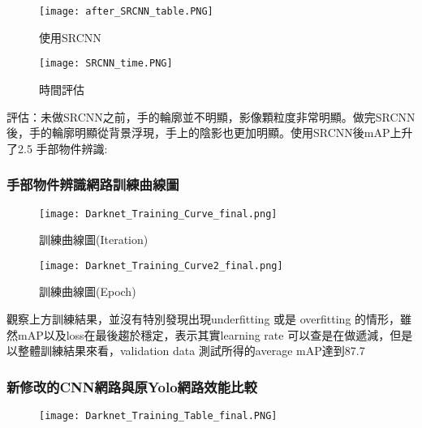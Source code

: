 \begin{figure}[H]
    \centering
    \texttt{[image: after\_SRCNN\_table.PNG]}
    \caption{使用SRCNN}
    \label{fig:使用SRCNN}
\end{figure}

\begin{figure}[H]
    \centering
    \texttt{[image: SRCNN\_time.PNG]}
    \caption{時間評估}
    \label{時間評估}
\end{figure}


評估：未做SRCNN之前，手的輪廓並不明顯，影像顆粒度非常明顯。做完SRCNN後，手的輪廓明顯從背景浮現，手上的陰影也更加明顯。使用SRCNN後mAP上升了2.5%
手部物件辨識:

\subsubsection{手部物件辨識網路訓練曲線圖}

\begin{figure}[H]
    \centering
    \texttt{[image: Darknet\_Training\_Curve\_final.png]}
    \caption{訓練曲線圖(Iteration)}
    \label{fig:訓練曲線圖(Iteration)}
\end{figure}

\begin{figure}[H]
    \centering
    \texttt{[image: Darknet\_Training\_Curve2\_final.png]}
    \caption{訓練曲線圖(Epoch)}
    \label{fig:訓練曲線圖(Epoch)}
\end{figure}


觀察上方訓練結果，並沒有特別發現出現underfitting 或是 overfitting 的情形，雖然mAP以及loss在最後趨於穩定，表示其實learning rate 可以查是在做遞減，但是以整體訓練結果來看，validation data 測試所得的average mAP達到87.7%

\subsubsection{新修改的CNN網路與原Yolo網路效能比較}

\begin{figure}[H]
    \centering
    \texttt{[image: Darknet\_Training\_Table\_final.PNG]}
    \caption{}
    
\end{figure}




